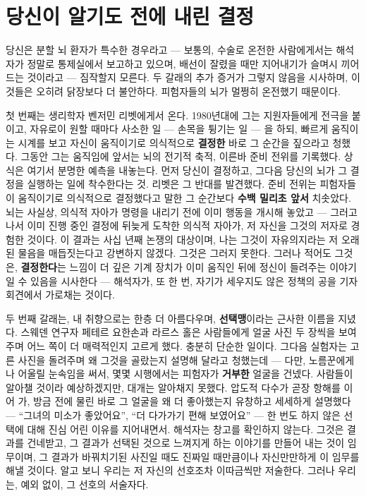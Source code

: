 \section*{당신이 알기도 전에 내린 결정}

당신은 분할 뇌 환자가 특수한 경우라고 — 보통의, 수술로 온전한 사람에게서는 해석자가 정말로 통제실에서 보고하고 있으며, 배선이 잘렸을 때만 지어내기가 슬며시 끼어드는 것이라고 — 짐작할지 모른다. 두 갈래의 추가 증거가 그렇지 않음을 시사하며, 이것들은 오히려 닭장보다 더 불안하다. 피험자들의 뇌가 멀쩡히 온전했기 때문이다.

첫 번째는 생리학자 벤저민 리벳에게서 온다. 1980년대에 그는 지원자들에게 전극을 붙이고, 자유로이 원할 때마다 사소한 일 — 손목을 튕기는 일 — 을 하되, 빠르게 움직이는 시계를 보고 자신이 움직이기로 의식적으로 \textbf{결정한} 바로 그 순간을 짚으라고 청했다. 그동안 그는 움직임에 앞서는 뇌의 전기적 축적, 이른바 준비 전위를 기록했다. 상식은 여기서 분명한 예측을 내놓는다. 먼저 당신이 결정하고, 그다음 당신의 뇌가 그 결정을 실행하는 일에 착수한다는 것. 리벳은 그 반대를 발견했다. 준비 전위는 피험자들이 움직이기로 의식적으로 결정했다고 말한 그 순간보다 \textbf{수백 밀리초 앞서} 치솟았다. 뇌는 사실상, 의식적 자아가 명령을 내리기 전에 이미 행동을 개시해 놓았고 — 그러고 나서 이미 진행 중인 결정에 뒤늦게 도착한 의식적 자아가, 저 자신을 그것의 저자로 경험한 것이다. 이 결과는 사십 년째 논쟁의 대상이며, 나는 그것이 자유의지라는 저 오래된 물음을 매듭짓는다고 강변하지 않겠다. 그것은 그러지 못한다. 그러나 적어도 그것은, \textbf{결정한다}는 느낌이 더 깊은 기계 장치가 이미 움직인 뒤에 정신이 들려주는 이야기일 수 있음을 시사한다 — 해석자가, 또 한 번, 자기가 세우지도 않은 정책의 공을 기자회견에서 가로채는 것이다.

두 번째 갈래는, 내 취향으로는 한층 더 아름다우며, \textbf{선택맹}이라는 근사한 이름을 지녔다. 스웨덴 연구자 페테르 요한손과 라르스 홀은 사람들에게 얼굴 사진 두 장씩을 보여 주며 어느 쪽이 더 매력적인지 고르게 했다. 충분히 단순한 일이다. 그다음 실험자는 고른 사진을 돌려주며 왜 그것을 골랐는지 설명해 달라고 청했는데 — 다만, 노름꾼에게나 어울릴 눈속임을 써서, 몇몇 시행에서는 피험자가 \textbf{거부한} 얼굴을 건넸다. 사람들이 알아챌 것이라 예상하겠지만, 대개는 알아채지 못했다. 압도적 다수가 곧장 항해를 이어 가, 방금 전에 물린 바로 그 얼굴을 왜 더 좋아했는지 유창하고 세세하게 설명했다 — ``그녀의 미소가 좋았어요'', ``더 다가가기 편해 보였어요'' — 한 번도 하지 않은 선택에 대해 진심 어린 이유를 지어내면서. 해석자는 창고를 확인하지 않는다. 그것은 결과를 건네받고, 그 결과가 선택된 것으로 느껴지게 하는 이야기를 만들어 내는 것이 임무이며, 그 결과가 바꿔치기된 사진일 때도 진짜일 때만큼이나 자신만만하게 이 임무를 해낼 것이다. 알고 보니 우리는 저 자신의 선호조차 이따금씩만 저술한다. 그러나 우리는, 예외 없이, 그 선호의 서술자다.

